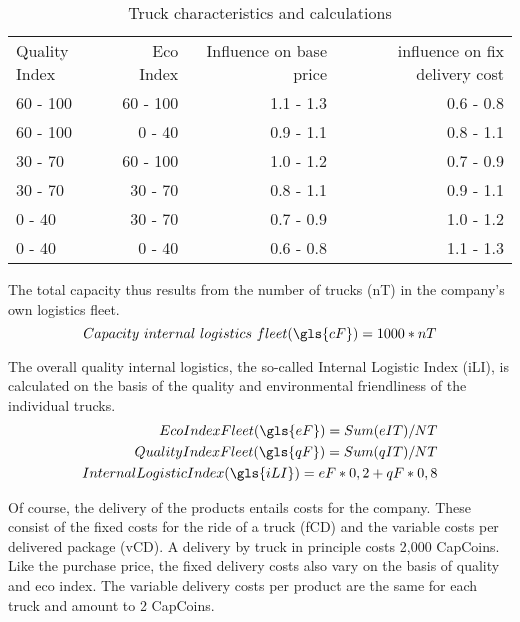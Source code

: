 \begin{table}[ht]
    \centering
    \begin{tabular}{|l|r|r|r|}
    \hline
    Quality Index & Eco Index & Influence on base price & influence on fix delivery cost \\
    60 - 100      & 60 - 100   & 1.1 - 1.3   & 0.6 - 0.8       \\
    60 - 100      & 0 - 40     & 0.9 - 1.1   & 0.8 - 1.1       \\
    30 - 70       & 60 - 100   & 1.0 - 1.2   & 0.7 - 0.9       \\
    30 - 70       & 30 - 70    & 0.8 - 1.1   & 0.9 - 1.1       \\
    0 - 40        & 30 - 70    & 0.7 - 0.9   & 1.0 - 1.2       \\
    0 - 40        & 0 - 40     & 0.6 - 0.8   & 1.1 - 1.3       \\
    \hline
    \end{tabular}
    \caption{Truck characteristics and calculations}
    \label{Truck_characteristics}
\end{table}

The total capacity thus results from the number of trucks (\gls{nT}) in the company's own logistics fleet. 
\begin{equation}
\label{func:capacityFleet}
    Capacity \ internal \ logistics \ fleet (\gls{cF}) = 1000 * nT
\end{equation}

The overall quality internal logistics, the so-called Internal Logistic Index (\gls{iLI}), is calculated on the basis of the quality and environmental friendliness of the individual trucks.  
\begin{equation}
\label{func:internalLogisticIndex}
\begin{aligned}
    Eco Index Fleet (\gls{eF}) = Sum (eIT) / NT \\
    Quality Index Fleet (\gls{qF}) = Sum (qIT) / NT \\
    Internal Logistic Index (\gls{iLI}) = eF * 0,2 + qF * 0,8 \\
\end{aligned}
\end{equation}

Of course, the delivery of the products entails costs for the company. These consist of the fixed costs for the ride of a truck (\gls{fCD}) and the variable costs per delivered package (\gls{vCD}). 
A delivery by truck in principle costs 2,000 CapCoins. Like the purchase price, the fixed delivery costs also vary on the basis of quality and eco index. The variable delivery costs per product are the same for each truck and amount to 2 CapCoins.

